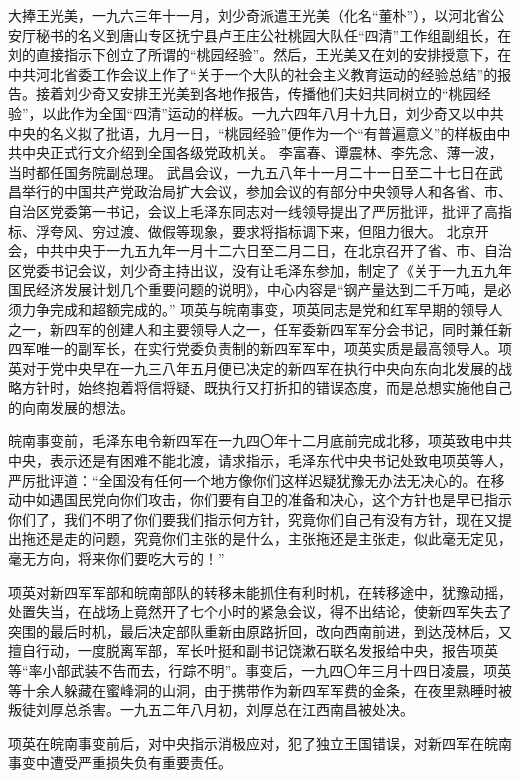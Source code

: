 \begin{maonote}
大捧王光美，一九六三年十一月，刘少奇派遣王光美（化名“董朴”），以河北省公安厅秘书的名义到唐山专区抚宁县卢王庄公社桃园大队任“四清”工作组副组长，在刘的直接指示下创立了所谓的“桃园经验”。然后，王光美又在刘的安排授意下，在中共河北省委工作会议上作了“关于一个大队的社会主义教育运动的经验总结”的报告。接着刘少奇又安排王光美到各地作报告，传播他们夫妇共同树立的“桃园经验”，以此作为全国“四清”运动的样板。一九六四年八月十九日，刘少奇又以中共中央的名义拟了批语，九月一日，“桃园经验”便作为一个“有普遍意义”的样板由中共中央正式行文介绍到全国各级党政机关。
李富春、谭震林、李先念、薄一波，当时都任国务院副总理。
武昌会议，一九五八年十一月二十一日至二十七日在武昌举行的中国共产党政治局扩大会议，参加会议的有部分中央领导人和各省、市、自治区党委第一书记，会议上毛泽东同志对一线领导提出了严厉批评，批评了高指标、浮夸风、穷过渡、做假等现象，要求将指标调下来，但阻力很大。
北京开会，中共中央于一九五九年一月十二六日至二月二日，在北京召开了省、市、自治区党委书记会议，刘少奇主持出议，没有让毛泽东参加，制定了《关于一九五九年国民经济发展计划几个重要问题的说明》，中心内容是“钢产量达到二千万吨，是必须力争完成和超额完成的。”
项英与皖南事变，项英同志是党和红军早期的领导人之一，新四军的创建人和主要领导人之一，任军委新四军军分会书记，同时兼任新四军唯一的副军长，在实行党委负责制的新四军军中，项英实质是最高领导人。项英对于党中央早在一九三八年五月便已决定的新四军在执行中央向东向北发展的战略方针时，始终抱着将信将疑、既执行又打折扣的错误态度，而是总想实施他自己的向南发展的想法。

皖南事变前，毛泽东电令新四军在一九四〇年十二月底前完成北移，项英致电中共中央，表示还是有困难不能北渡，请求指示，毛泽东代中央书记处致电项英等人，严厉批评道：“全国没有任何一个地方像你们这样迟疑犹豫无办法无决心的。在移动中如遇国民党向你们攻击，你们要有自卫的准备和决心，这个方针也是早已指示你们了，我们不明了你们要我们指示何方针，究竟你们自己有没有方针，现在又提出拖还是走的问题，究竟你们主张的是什么，主张拖还是主张走，似此毫无定见，毫无方向，将来你们要吃大亏的！”

项英对新四军军部和皖南部队的转移未能抓住有利时机，在转移途中，犹豫动摇，处置失当，在战场上竟然开了七个小时的紧急会议，得不出结论，使新四军失去了突围的最后时机，最后决定部队重新由原路折回，改向西南前进，到达茂林后，又擅自行动，一度脱离军部，军长叶挺和副书记饶漱石联名发报给中央，报告项英等“率小部武装不告而去，行踪不明”。事变后，一九四〇年三月十四日凌晨，项英等十余人躲藏在蜜峰洞的山洞，由于携带作为新四军军费的金条，在夜里熟睡时被叛徒刘厚总杀害。一九五二年八月初，刘厚总在江西南昌被处决。

项英在皖南事变前后，对中央指示消极应对，犯了独立王国错误，对新四军在皖南事变中遭受严重损失负有重要责任。


\end{maonote}
